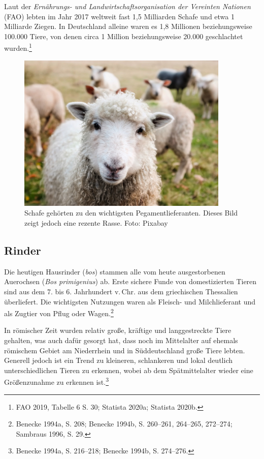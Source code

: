 \documentclass[a4paper,
fontsize=11pt,
oneside,
numbers=noperiodatend,
parskip=half-,
bibliography=totoc,
final
]{scrartcl}
\begin{document}
Laut der \emph{Ernährungs- und Landwirtschaftsorganisation der Vereinten
Nationen} (FAO) lebten im Jahr 2017 weltweit fast 1,5 Milliarden Schafe
und etwa 1 Milliarde Ziegen. In Deutschland alleine waren es 1,8
Millionen beziehungsweise 100.000 Tiere, von denen circa 1 Million
beziehungsweise 20.000 geschlachtet wurden.\footnote{FAO 2019, Tabelle 6
  S. 30; Statista 2020a; Statista 2020b.}

\begin{figure}[h!]
\centering
\includegraphics[width=0.9\textwidth]{img/image1.jpg}
\caption{Schafe gehörten zu den wichtigsten Pegamentlieferanten. Dieses Bild zeigt jedoch eine rezente Rasse. Foto: Pixabay}
\end{figure}

\hypertarget{rinder}{%
\subsection{Rinder}\label{rinder}}

Die heutigen Hausrinder (\emph{bos}) stammen alle vom heute
ausgestorbenen Auerochsen (\emph{Bos primigenius}) ab. Erste sichere
Funde von domestizierten Tieren sind aus dem 7. bis 6. Jahrhundert
v.\,Chr. aus dem griechischen Thessalien überliefert. Die wichtigsten
Nutzungen waren als Fleisch- und Milchlieferant und als Zugtier von
Pflug oder Wagen.\footnote{Benecke 1994a, S. 208; Benecke 1994b, S.
  260--261, 264--265, 272--274; Sambraus 1996, S. 29.}

In römischer Zeit wurden relativ große, kräftige und langgestreckte
Tiere gehalten, was auch dafür gesorgt hat, dass noch im Mittelalter auf
ehemals römischem Gebiet am Niederrhein und in Süddeutschland große
Tiere lebten. Generell jedoch ist ein Trend zu kleineren, schlankeren
und lokal deutlich unterschiedlichen Tieren zu erkennen, wobei ab dem
Spätmittelalter wieder eine Größenzunahme zu erkennen ist.\footnote{Benecke
  1994a, S. 216--218; Benecke 1994b, S. 274--276.}
\end{document}

